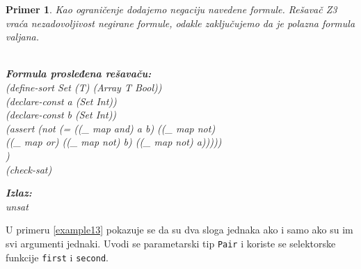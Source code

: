 \documentclass[12pt,oneside]{memoir}
\newcommand\tab[1][0.5cm]{\hspace*{#1}}
\newtheorem{primer}{Primer}
\begin{document}
\begin{primer} \label{example12} 
Kao ograničenje dodajemo negaciju navedene formule. Rešavač Z3 vraća nezadovoljivost negirane formule, odakle zaključujemo da je polazna formula valjana.\\ \\
\begin{minipage}[b]{0.65\textwidth}
\textbf{Formula prosleđena rešavaču:}
\\(define-sort Set (T) (Array T Bool))
\\(declare-const a (Set Int))
\\(declare-const b (Set Int))
\\(assert (not (= ((\_ map and) a b) ((\_ map not) 
\\\tab((\_ map or) ((\_ map not) b) ((\_ map not) a)))))
\\)
\\(check-sat)
\end{minipage}
\hspace{2.5cm} 
\begin{minipage}[t]{0.5\textwidth}
\vspace{-4.65cm}
\textbf{Izlaz:}
\\unsat 
\end{minipage}
\end{primer}

\par
U primeru \ref{example13} pokazuje se da su dva sloga jednaka ako i samo ako su im svi argumenti jednaki. Uvodi se parametarski tip \texttt{Pair} i koriste se selektorske funkcije \texttt{first} i \texttt{second}. 
\end{document}
